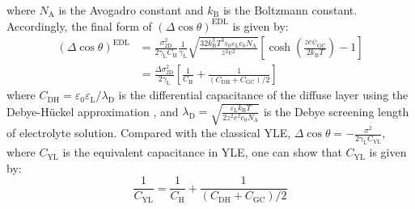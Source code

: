 where \(N_{\mathrm{A}}\) is the Avogadro constant and \(k_{\mathrm{B}}\)
is the Boltzmann constant. Accordingly, the final form
of \((\Delta \cos \theta)^{\mathrm{EDL}}\) is given by:
\begin{equation}
\label{eqn:wet-Delta-cos-EDL-final}
\begin{aligned}
(\Delta \cos \theta)^{\mathrm{EDL}} &= \frac{\sigma_{\mathrm{2D}}^{2}}{2\gamma_{\mathrm{L}}
                                       C_{\mathrm{H}}}\frac{1}{\gamma_{\mathrm{L}}}
                                       \sqrt{\frac{32k_{\mathrm{B}}^{3}T^{3} \varepsilon_{0}\varepsilon_{\mathrm{L}} c_{0} 
                                       N_{\mathrm{A}}}{z^{2}e^{2}}} 
                                       \left[\cosh(\frac{z e \psi_{\mathrm{GC}}}{2k_{\mathrm{B}} T}) -1 \right]\\
                                    &= \frac{\Delta \sigma_{\mathrm{2D}}^{2}}{2\gamma_{\mathrm{L}}}
                                       \left[ \frac{1}{C_{\mathrm{H}}} + \frac{1}{(C_{\mathrm{DH}} + 
                                       C_{\mathrm{GC}})/2}\right]
\end{aligned}
\end{equation}
where
\(C_{\mathrm{DH}}=\varepsilon_{0}\varepsilon_{\mathrm{L}}/\lambda_{\mathrm{D}}\)
is the differential capacitance of the diffuse layer using the
Debye-Hückel approximation \cite{Bard_1980_electrochem_book}, and
\(\lambda_{\mathrm{D}}=\sqrt{\frac{\varepsilon_{\mathrm{L}}k_{\mathrm{B}}T}{2z^{2}e^{2}c_{0}N_{\mathrm{A}}}}\)
is the Debye screening length of electrolyte solution.
%
Compared with the
classical YLE,
\(\Delta \cos \theta =
-\frac{\sigma^{2}}{2\gamma_{\mathrm{L}}C_{\mathrm{YL}}}\), where
\(C_{\mathrm{YL}}\) is the equivalent capacitance in YLE, one can show
that \(C_{\mathrm{YL}}\) is given by:
\begin{equation}
\label{eqn:wet-CYL-model}
\frac{1}{C_{\mathrm{YL}}} = \frac{1}{C_{\mathrm{H}}} + \frac{1}{(C_{\mathrm{DH}} + C_{\mathrm{GC}})/2}
\end{equation}


